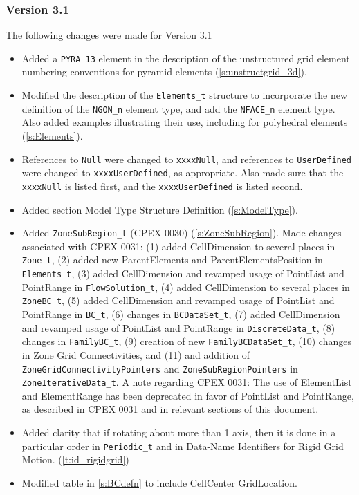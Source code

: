 \subsubsection{Version 3.1}
The following changes were made for Version 3.1

\begin{itemize}
\item Added a \texttt{PYRA\_13} element in the description of the unstructured grid
      element numbering conventions for pyramid elements
      (\autoref{s:unstructgrid_3d}).
\item Modified the description of the \texttt{Elements\_t} structure to incorporate
      the new definition of the \texttt{NGON\_n} element type, and add the
      \texttt{NFACE\_n} element type. Also added examples illustrating their use,
      including for polyhedral elements
      (\autoref{s:Elements}).
\item References to \texttt{Null} were changed to \texttt{xxxxNull}, and references to
      \texttt{UserDefined} were changed to \texttt{xxxxUserDefined}, as appropriate.
      Also made sure that the \texttt{xxxxNull} is listed first, and the
      \texttt{xxxxUserDefined} is listed second.
\item Added section Model Type Structure Definition
      (\autoref{s:ModelType}).
\item Added \texttt{ZoneSubRegion\_t} (CPEX 0030) (\autoref{s:ZoneSubRegion}).
      Made changes associated with CPEX
      0031: (1) added CellDimension to several places in \texttt{Zone\_t}, (2) added
      new ParentElements and ParentElementsPosition in \texttt{Elements\_t},
      (3) added CellDimension and revamped usage of PointList and PointRange in
      \texttt{FlowSolution\_t}, (4) added CellDimension to several places in
      \texttt{ZoneBC\_t}, (5) added CellDimension and revamped usage of PointList
      and PointRange in \texttt{BC\_t}, (6) changes in \texttt{BCDataSet\_t},
      (7) added CellDimension and revamped usage of PointList and PointRange in
      \texttt{DiscreteData\_t}, (8) changes in \texttt{FamilyBC\_t}, (9) creation
      of new \texttt{FamilyBCDataSet\_t}, (10) changes in Zone Grid Connectivities,
      and (11) and addition of \texttt{ZoneGridConnectivityPointers} and
      \texttt{ZoneSubRegionPointers} in \texttt{ZoneIterativeData\_t}.
      A note regarding CPEX 0031:  The use of ElementList and ElementRange has been
      deprecated in favor of PointList and PointRange, as described in CPEX 0031 and
      in relevant sections of this document.
\item Added clarity that if rotating about more than 1 axis, then it is done in a
      particular order in \texttt{Periodic\_t} and in Data-Name Identifiers for
      Rigid Grid Motion.
      (\autoref{t:id_rigidgrid})
\item Modified table in \autoref{s:BCdefn} to include CellCenter GridLocation.
\end{itemize}

